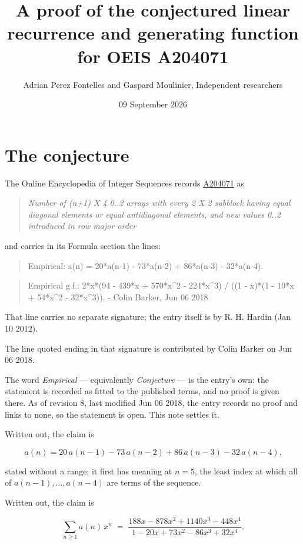 \documentclass[11pt]{article}
\title{A proof of the conjectured linear recurrence and generating function for OEIS A204071}
\author{Adrian Perez Fontelles and Gaspard Moulinier, Independent researchers}
\date{09 September 2026}
\theoremstyle{definition}
\begin{document}
\maketitle
\section{The conjecture}

The Online Encyclopedia of Integer Sequences records \href{https://oeis.org/A204071}{A204071} as

\begin{quote}\itshape Number of (n+1) X 4 0..2 arrays with every 2 X 2 subblock having equal diagonal elements or equal antidiagonal elements, and new values 0..2 introduced in row major order\end{quote}

and carries in its Formula section the lines:

\begin{quote}\ttfamily Empirical: a(n) = 20*a(n-1) - 73*a(n-2) + 86*a(n-3) - 32*a(n-4).\end{quote}

\begin{quote}\ttfamily Empirical g.f.: 2*x*(94 - 439*x + 570*x\textasciicircum{}2 - 224*x\textasciicircum{}3) / ((1 - x)*(1 - 19*x + 54*x\textasciicircum{}2 - 32*x\textasciicircum{}3)). - Colin Barker, Jun 06 2018\end{quote}

That line carries no separate signature; the entry itself is by R. H. Hardin (Jan 10 2012).

The line quoted ending in that signature is contributed by Colin Barker on Jun 06 2018.

The word {\itshape Empirical} --- equivalently {\itshape Conjecture} --- is the entry's own: the statement is recorded as fitted to the published terms, and no proof is given there. As of revision 8, last modified Jun 06 2018, the entry records no proof and links to none, so the statement is open. This note settles it.

Written out, the claim is

\[a(n) = 20\,a(n-1) - 73\,a(n-2) + 86\,a(n-3) - 32\,a(n-4).\]

stated without a range; it first has meaning at $n = 5$, the least index at which all of $a(n-1),\dots,a(n-4)$ are terms of the sequence.

Written out, the claim is

\[\sum_{n \ge 1} a(n)\,x^n \;=\; \frac{188x - 878x^{2} + 1140x^{3} - 448x^{4}}{1 - 20x + 73x^{2} - 86x^{3} + 32x^{4}}.\]
\end{document}
